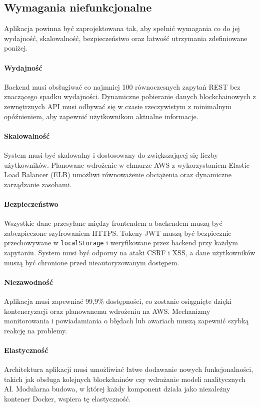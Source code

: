 \begin{itemize}
\subsection{Wymagania niefunkcjonalne}
Aplikacja powinna być zaprojektowana tak, aby spełnić wymagania co do jej wydajność, skalowalność, bezpieczeństwo oraz łatwość utrzymania zdefiniowane poniżej.

\paragraph{Wydajność}
Backend musi obsługiwać co najmniej 100 równoczesnych zapytań REST bez znaczącego spadku wydajności. Dynamiczne pobieranie danych blockchainowych z zewnętrznych API musi odbywać się w czasie rzeczywistym z minimalnym opóźnieniem, aby zapewnić użytkownikom aktualne informacje.

\paragraph{Skalowalność}
System musi być skalowalny i dostosowany do zwiększającej się liczby użytkowników. Planowane wdrożenie w chmurze AWS z wykorzystaniem Elastic Load Balancer (ELB) umożliwi równoważenie obciążenia oraz dynamiczne zarządzanie zasobami.

\paragraph{Bezpieczeństwo}
Wszystkie dane przesyłane między frontendem a backendem muszą być zabezpieczone szyfrowaniem HTTPS. Tokeny JWT muszą być bezpiecznie przechowywane w \texttt{localStorage} i weryfikowane przez backend przy każdym zapytaniu. System musi być odporny na ataki CSRF i XSS, a dane użytkowników muszą być chronione przed nieautoryzowanym dostępem.

\paragraph{Niezawodność}
Aplikacja musi zapewniać 99,9\% dostępności, co zostanie osiągnięte dzięki konteneryzacji oraz planowanemu wdrożeniu na AWS. Mechanizmy monitorowania i powiadamiania o błędach lub awariach muszą zapewnić szybką reakcję na problemy.

\paragraph{Elastyczność}
Architektura aplikacji musi umożliwiać łatwe dodawanie nowych funkcjonalności, takich jak obsługa kolejnych blockchainów czy wdrażanie modeli analitycznych AI. Modularna budowa, w której każdy komponent działa jako niezależny kontener Docker, wspiera tę elastyczność.


\end{itemize}
